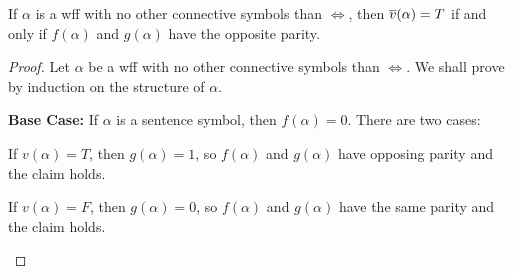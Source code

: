 \begin{problem}
\begin{enumalph}
      \step

      \newpage
      \begin{claim}
        If $\alpha$ is a wff with no other connective symbols than $\iff$,
        then $\overline{v}(\alpha) = T$ if and only if $f(\alpha)$ and $g(\alpha)$
        have the opposite parity.

        \begin{proof}
          
          Let $\alpha$ be a wff with no other connective symbols than $\iff$.
          We shall prove by induction on the structure of $\alpha$.
    
          \step
          \textbf{Base Case:} If $\alpha$ is a sentence symbol, then $f(\alpha) = 0$.
            There are two cases:
            \begin{enumroman}
              \item If $v(\alpha) = T$, then $g(\alpha) = 1$, so $f(\alpha)$ and $g(\alpha)$
                have opposing parity and the claim holds.
              \item If $v(\alpha) = F$, then $g(\alpha) = 0$, so $f(\alpha)$ and $g(\alpha)$
                have the same parity and the claim holds.
            \end{enumroman}
    

\end{proof}
\end{claim}
\end{enumalph}
\end{problem}

